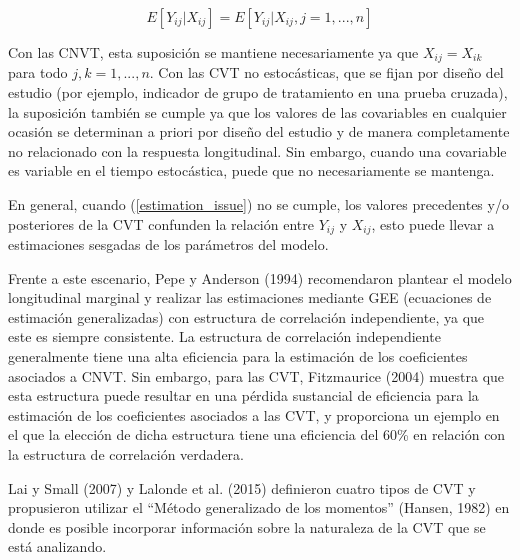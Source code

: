 \documentclass[spanish]{article}
\numberwithin{figure}{subsection}
\numberwithin{equation}{subsection}
\numberwithin{table}{subsection}
\begin{document}

\begin{equation}
\label{estimation_issue}
	E[Y_{ij} | X_{ij}] = E[Y_{ij} | X_{ij}, j = 1, ..., n]
\end{equation}

Con las CNVT, esta suposición se mantiene necesariamente ya que $X_{ij} =
X_{ik}$ para todo $j, k = 1, ..., n$. Con las CVT no estocásticas, que se fijan
por diseño del estudio (por ejemplo, indicador de grupo de tratamiento en una
prueba cruzada), la suposición también se cumple ya que los valores de las
covariables en cualquier ocasión se determinan a priori por diseño del estudio y
de manera completamente no relacionado con la respuesta longitudinal. Sin
embargo, cuando una covariable es variable en el tiempo estocástica, puede que
no necesariamente se mantenga.

En general, cuando (\ref{estimation_issue}) no se cumple, los valores
precedentes y/o posteriores de la CVT confunden la relación entre $Y_{ij}$ y
$X_{ij}$, esto puede llevar a estimaciones sesgadas de los parámetros del
modelo.

Frente a este escenario, Pepe y Anderson (1994) recomendaron plantear el modelo
longitudinal marginal y realizar las estimaciones mediante GEE (ecuaciones de
estimación generalizadas) con estructura de correlación independiente, ya que
este es siempre consistente. La estructura de correlación independiente
generalmente tiene una alta eficiencia para la estimación de los coeficientes
asociados a CNVT. Sin embargo, para las CVT, Fitzmaurice (2004) muestra que esta
estructura puede resultar en una pérdida sustancial de eficiencia para la
estimación de los coeficientes asociados a las CVT, y proporciona un ejemplo en
el que la elección de dicha estructura tiene una eficiencia del 60\% en relación
con la estructura de correlación verdadera.

Lai y Small (2007) y Lalonde et al. (2015) definieron cuatro tipos de CVT y
propusieron utilizar el ``Método generalizado de los momentos'' (Hansen, 1982)
en donde es posible incorporar información sobre la naturaleza de la CVT que se
está analizando.

\end{document}
